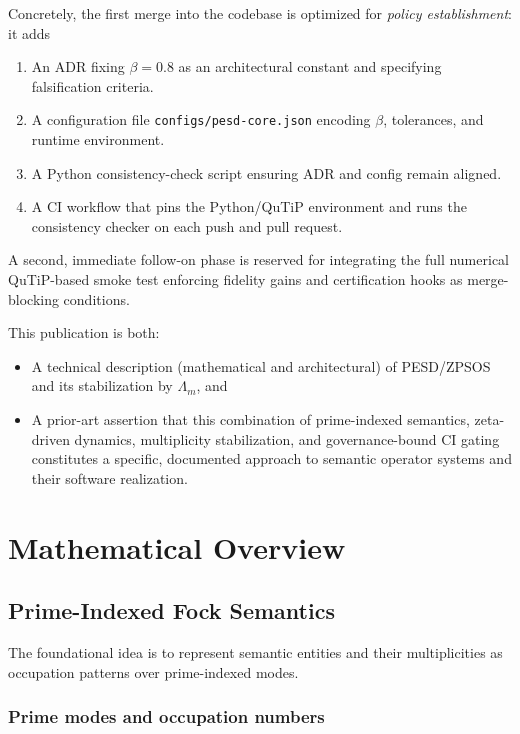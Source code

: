 \documentclass[11pt]{article}
\begin{document}
Concretely, the first merge into the codebase is optimized for \emph{policy establishment}: it adds
\begin{enumerate}[nosep]
  \item An ADR fixing \(\beta = 0.8\) as an architectural constant and specifying falsification criteria.
  \item A configuration file \texttt{configs/pesd-core.json} encoding \(\beta\), tolerances, and runtime environment.
  \item A Python consistency-check script ensuring ADR and config remain aligned.
  \item A CI workflow that pins the Python/QuTiP environment and runs the consistency checker on each push and pull request.
\end{enumerate}

A second, immediate follow-on phase is reserved for integrating the full numerical QuTiP-based smoke test enforcing fidelity gains and certification hooks as merge-blocking conditions.

This publication is both:
\begin{itemize}[nosep]
  \item A technical description (mathematical and architectural) of PESD/ZPSOS and its stabilization by \(\Lambda_m\), and
  \item A prior-art assertion that this combination of prime-indexed semantics, zeta-driven dynamics, multiplicity stabilization, and governance-bound CI gating constitutes a specific, documented approach to semantic operator systems and their software realization.
\end{itemize}


\section{Mathematical Overview}

\subsection{Prime-Indexed Fock Semantics}

The foundational idea is to represent semantic entities and their multiplicities as occupation patterns over prime-indexed modes.

\subsubsection{Prime modes and occupation numbers}
\end{document}
